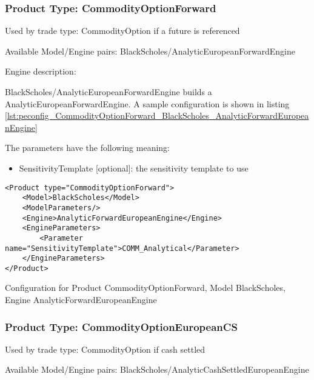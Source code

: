 \subsubsection{Product Type: CommodityOptionForward}

Used by trade type: CommodityOption if a future is referenced

Available Model/Engine pairs: BlackScholes/AnalyticEuropeanForwardEngine

Engine description:

BlackScholes/AnalyticEuropeanForwardEngine builds a AnalyticEuropeanForwardEngine. A sample configuration is shown in listing
\ref{lst:peconfig_CommodityOptionForward_BlackScholes_AnalyticForwardEuropeanEngine}

The parameters have the following meaning:

\begin{itemize}
\item SensitivityTemplate [optional]: the sensitivity template to use 
\end{itemize}

\begin{longlisting}
\begin{verbatim}
<Product type="CommodityOptionForward">
    <Model>BlackScholes</Model>
    <ModelParameters/>
    <Engine>AnalyticForwardEuropeanEngine</Engine>
    <EngineParameters>
        <Parameter name="SensitivityTemplate">COMM_Analytical</Parameter>
    </EngineParameters>
</Product>
\end{verbatim}
\caption{Configuration for Product CommodityOptionForward, Model BlackScholes, Engine AnalyticForwardEuropeanEngine}
\label{lst:peconfig_CommodityOptionForward_BlackScholes_AnalyticForwardEuropeanEngine}
\end{longlisting}

\subsubsection{Product Type: CommodityOptionEuropeanCS}

Used by trade type: CommodityOption if cash settled

Available Model/Engine pairs: BlackScholes/AnalyticCashSettledEuropeanEngine

